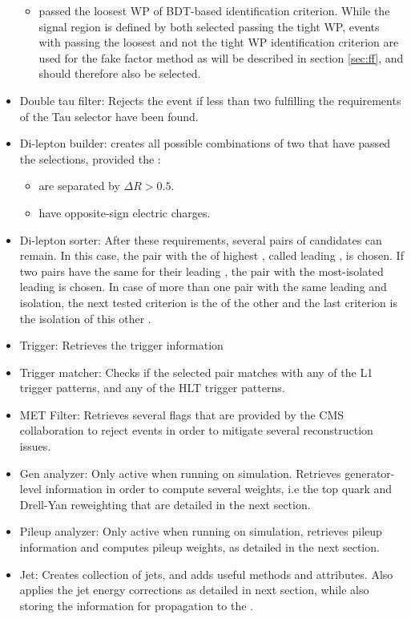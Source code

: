 \begin{itemize}
\begin{itemize}
    \item passed the loosest WP of \tauh BDT-based identification criterion. While the signal region is defined by both selected \tauh passing the tight WP, events with \tauh passing the loosest and not the tight WP identification criterion are used for the fake factor method as will be described in section \ref{sec:ff}, and should therefore also be selected.
    \end{itemize}
    \item Double tau filter: Rejects the event if less than two \tauh fulfilling the requirements of the Tau selector have been found.
    \item Di-lepton builder: creates all possible combinations of two \tauh that have passed the selections, provided the \tauh:
    \begin{itemize}
    \item are separated by $\Delta R > 0.5$.
    \item have opposite-sign electric charges.
    \end{itemize}
    \item Di-lepton sorter: After these requirements, several pairs of \tauh candidates can remain. In this case, the pair with the \tauh of highest \pt, called leading \tauh, is chosen. If two pairs have the same \pt for their leading \tauh, the pair with the most-isolated leading \tauh is chosen. In case of more than one pair with the same leading \tauh \pt and isolation, the next tested criterion is the \pt of the other \tauh and the last criterion is the isolation of this other \tauh.
    \item Trigger: Retrieves the trigger information
    \item Trigger matcher: Checks if the selected \tauh pair matches with any of the L1 trigger patterns, and any of the HLT trigger patterns.
    \item MET Filter: Retrieves several flags that are provided by the CMS collaboration to reject events in order to mitigate several \MET reconstruction issues.
    \item Gen analyzer: Only active when running on simulation. Retrieves generator-level information in order to compute several weights, i.e the top quark and Drell-Yan \pt reweighting that are detailed in the next section.
    \item Pileup analyzer: Only active when running on simulation, retrieves pileup information and computes pileup weights, as detailed in the next section.
    \item Jet: Creates collection of jets, and adds useful methods and attributes. Also applies the jet energy corrections as detailed in next section, while also storing the information for propagation to the \MET.

\end{itemize}
